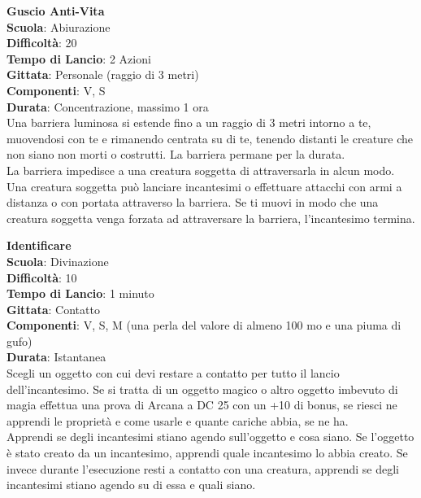 \begin{multicols}{2}
\medskip\textbf{Guscio Anti-Vita}\\
\textbf{Scuola}: Abiurazione\\
\textbf{Difficoltà}: 20\\
\textbf{Tempo di Lancio}: 2 Azioni\\
\textbf{Gittata}: Personale (raggio di 3 metri)\\
\textbf{Componenti}: V, S\\
\textbf{Durata}: Concentrazione, massimo 1 ora\\
Una barriera luminosa si estende fino a un raggio di 3 metri intorno a te, muovendosi con te e rimanendo centrata su di te, tenendo distanti le creature che non siano non morti o costrutti. La barriera permane per la durata. \\
La barriera impedisce a una creatura soggetta di attraversarla in alcun modo. Una creatura soggetta può lanciare incantesimi o effettuare attacchi con armi a distanza o con portata attraverso la barriera. Se ti muovi in modo che una creatura soggetta venga forzata ad attraversare la barriera, l'incantesimo termina.

\medskip\textbf{Identificare}\\
\textbf{Scuola}: Divinazione\\
\textbf{Difficoltà}: 10\\
\textbf{Tempo di Lancio}: 1 minuto\\
\textbf{Gittata}: Contatto\\
\textbf{Componenti}: V, S, M (una perla del valore di almeno 100 mo e una piuma di gufo)\\ \textbf{Durata}: Istantanea\\
Scegli un oggetto con cui devi restare a contatto per tutto il lancio dell'incantesimo. Se si tratta di un oggetto magico o altro oggetto imbevuto di magia effettua una prova di Arcana a DC 25 con un +10 di bonus, se riesci ne apprendi le proprietà e come usarle e quante cariche abbia, se ne ha. \\
Apprendi se degli incantesimi stiano agendo sull'oggetto e cosa siano. Se l'oggetto è stato creato da un incantesimo, apprendi quale incantesimo lo abbia creato. Se invece durante l'esecuzione resti a contatto con una creatura, apprendi se degli incantesimi stiano agendo su di essa e quali siano.


\end{multicols}
